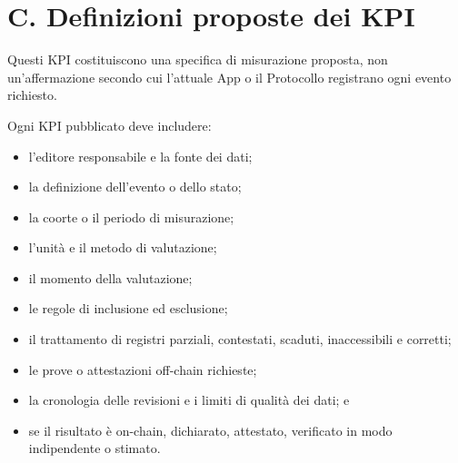 \documentclass[11pt]{article}
\begin{document}
\section*{C. Definizioni proposte dei KPI}

Questi KPI costituiscono una specifica di misurazione proposta, non un'affermazione secondo cui l'attuale App o il Protocollo registrano ogni evento richiesto.

Ogni KPI pubblicato deve includere:

\begin{itemize}[leftmargin=*]
\item l'editore responsabile e la fonte dei dati;
\item la definizione dell'evento o dello stato;
\item la coorte o il periodo di misurazione;
\item l'unità e il metodo di valutazione;
\item il momento della valutazione;
\item le regole di inclusione ed esclusione;
\item il trattamento di registri parziali, contestati, scaduti, inaccessibili e corretti;
\item le prove o attestazioni off-chain richieste;
\item la cronologia delle revisioni e i limiti di qualità dei dati; e
\item se il risultato è on-chain, dichiarato, attestato, verificato in modo indipendente o stimato.
\end{itemize}
\end{document}
